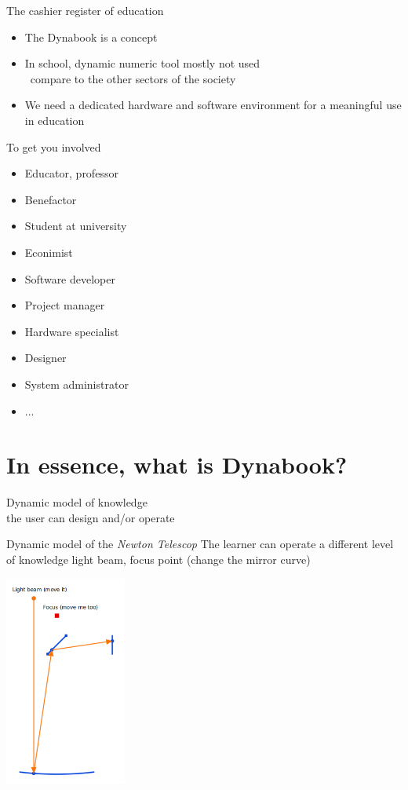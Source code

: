 \documentclass{beamer}
\newcommand{\tip}{\boldmath{\textcolor{red}{$\Rightarrow$}}}
\begin{document}
\begin{frame}{The cashier register of education}
  \begin{itemize}
  \item The Dynabook is a concept
  \item In school, dynamic numeric tool mostly not used\\
    \tip\ compare to the other sectors of the society
  \item We need a dedicated hardware and software environment for a
    meaningful use in education
\end{itemize}
\end{frame}
%
\begin{frame}{To get you involved}
  \begin{itemize}
  \item Educator, professor
  \item Benefactor
  \item Student at university
  \item Econimist
  \item Software developer
  \item Project manager
  \item Hardware specialist
  \item Designer
  \item System administrator
  \item ...
  \end{itemize}
\end{frame}

\section{In essence, what is Dynabook?}
\begin{frame}
  \fontsize{14pt}{8pt}\selectfont
\begin{center}
  Dynamic model of knowledge\\ the user can design and/or operate
\end{center}
\end{frame}
%
\begin{frame}{Dynamic model of the \emph{Newton Telescop}}
 The learner
  can operate a different level of knowledge light beam, focus point
  (change the mirror curve)
\begin{center}
  \includegraphics[width=0.3\textwidth]{Newton.png}
\end{center}
\end{frame}
\end{document}
